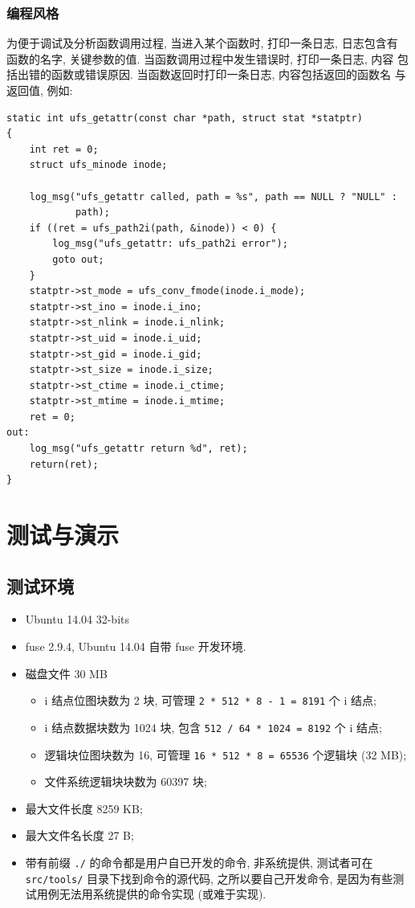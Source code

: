 \documentclass[nofonts, titlepage]{ctexart}
\begin{document}
\subsubsection{编程风格}
为便于调试及分析函数调用过程, 当进入某个函数时, 打印一条日志, 日志包含有
函数的名字, 关键参数的值. 当函数调用过程中发生错误时, 打印一条日志, 内容
包括出错的函数或错误原因. 当函数返回时打印一条日志, 内容包括返回的函数名
与返回值, 例如:
\begin{verbatim}
static int ufs_getattr(const char *path, struct stat *statptr)
{
    int ret = 0;
    struct ufs_minode inode;

    log_msg("ufs_getattr called, path = %s", path == NULL ? "NULL" :
            path);
    if ((ret = ufs_path2i(path, &inode)) < 0) {
        log_msg("ufs_getattr: ufs_path2i error");
        goto out;
    }
    statptr->st_mode = ufs_conv_fmode(inode.i_mode);
    statptr->st_ino = inode.i_ino;
    statptr->st_nlink = inode.i_nlink;
    statptr->st_uid = inode.i_uid;
    statptr->st_gid = inode.i_gid;
    statptr->st_size = inode.i_size;
    statptr->st_ctime = inode.i_ctime;
    statptr->st_mtime = inode.i_mtime;
    ret = 0;
out:
    log_msg("ufs_getattr return %d", ret);
    return(ret);
}
\end{verbatim}
\section{测试与演示}\label{ux6d4bux8bd5ux4e0eux6f14ux793a}

\subsection{测试环境}\label{ux6d4bux8bd5ux73afux5883}

\begin{itemize}
\item
  Ubuntu 14.04 32-bits
\item
  fuse 2.9.4, Ubuntu 14.04 自带 fuse 开发环境.
\item
  磁盘文件 30 MB

  \begin{itemize}
  \item
    i 结点位图块数为 2 块, 可管理 \texttt{2 * 512 * 8 - 1 = 8191} 个 i
    结点;
  \item
    i 结点数据块数为 1024 块, 包含 \texttt{512 / 64 * 1024 = 8192} 个 i
    结点;
  \item
    逻辑块位图块数为 16, 可管理 \texttt{16 * 512 * 8 = 65536} 个逻辑块
    (32 MB);
  \item
    文件系统逻辑块块数为 60397 块;
  \end{itemize}
\item
  最大文件长度 8259 KB;
\item
  最大文件名长度 27 B;
\item
  带有前缀 \texttt{./} 的命令都是用户自已开发的命令, 非系统提供,
  测试者可在 \texttt{src/tools/} 目录下找到命令的源代码, 之所以要自己开发命令,
  是因为有些测试用例无法用系统提供的命令实现 (或难于实现).
\end{itemize}
\end{document}
